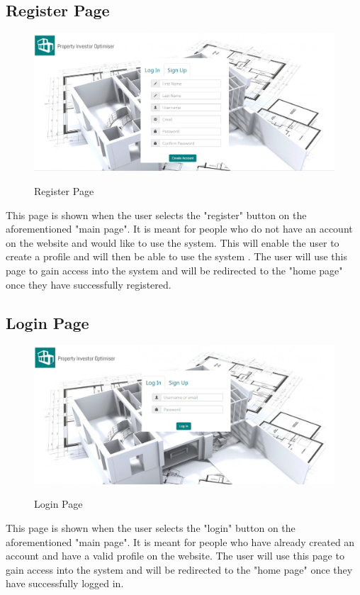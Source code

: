 \documentclass[a4paper,12pt]{article}
\begin{document}
\subsection{Register Page}
	\begin{figure}[H]
		\includegraphics[width=0.9\linewidth, center]{./System/Register.PNG}\\[0.4cm]  
		\caption{Register Page}
	\end{figure}
This page is shown when the user selects the "register" button on the aforementioned "main page". It is meant for people who do not have an account on the website and would like to use the system. This will enable the user to create a profile and will then be able to use the system . The user will use this page to gain access into the system and will be redirected to the "home page" once they have successfully registered.

\subsection{Login Page}
	\begin{figure}[H]
		\includegraphics[width=0.9\linewidth, center]{./System/Login.PNG}\\[0.4cm]  
		\caption{Login Page}
	\end{figure}
This page is shown when the user selects the "login" button on the aforementioned "main page". It is meant for people who have already created an account and have a valid profile on the website. The user will use this page to gain access into the system and will be redirected to the "home page" once they have successfully logged in.
\end{document}
